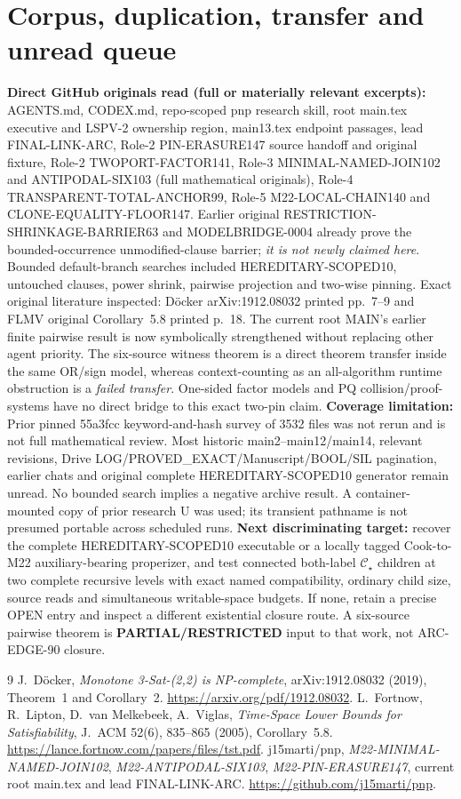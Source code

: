 \documentclass[11pt]{article}
\newcommand{\CS}{\mathcal C_{\star}}
\begin{document}
\section{Corpus, duplication, transfer and unread queue}
\textbf{Direct GitHub originals read (full or materially relevant excerpts):} AGENTS.md, CODEX.md, repo-scoped pnp research skill, root main.tex executive and LSPV-2 ownership region, main13.tex endpoint passages, lead FINAL-LINK-ARC, Role-2 PIN-ERASURE147 source handoff and original fixture, Role-2 TWOPORT-FACTOR141, Role-3 MINIMAL-NAMED-JOIN102 and ANTIPODAL-SIX103 (full mathematical originals), Role-4 TRANSPARENT-TOTAL-ANCHOR99, Role-5 M22-LOCAL-CHAIN140 and CLONE-EQUALITY-FLOOR147. Earlier original RESTRICTION-SHRINKAGE-BARRIER63 and MODELBRIDGE-0004 already prove the bounded-occurrence unmodified-clause barrier; \emph{it is not newly claimed here}. Bounded default-branch searches included HEREDITARY-SCOPED10, untouched clauses, power shrink, pairwise projection and two-wise pinning. Exact original literature inspected: D\"ocker arXiv:1912.08032 printed pp.~7--9 and FLMV original Corollary~5.8 printed p.~18. The current root MAIN's earlier finite pairwise result is now symbolically strengthened without replacing other agent priority. The six-source witness theorem is a direct theorem transfer inside the same OR/sign model, whereas context-counting as an all-algorithm runtime obstruction is a \emph{failed transfer}. One-sided factor models and PQ collision/proof-systems have no direct bridge to this exact two-pin claim.
\textbf{Coverage limitation:} Prior pinned 55a3fcc keyword-and-hash survey of 3532 files was not rerun and is not full mathematical review. Most historic main2--main12/main14, relevant revisions, Drive LOG/PROVED\_EXACT/Manuscript/BOOL/SIL pagination, earlier chats and original complete HEREDITARY-SCOPED10 generator remain unread. No bounded search implies a negative archive result. A container-mounted copy of prior research U was used; its transient pathname is not presumed portable across scheduled runs.
\textbf{Next discriminating target:} recover the complete HEREDITARY-SCOPED10 executable or a locally tagged Cook-to-M22 auxiliary-bearing properizer, and test connected both-label \(\CS\) children at two complete recursive levels with exact named compatibility, ordinary child size, source reads and simultaneous writable-space budgets. If none, retain a precise OPEN entry and inspect a different existential closure route. A six-source pairwise theorem is \textbf{PARTIAL/RESTRICTED} input to that work, not ARC-EDGE-90 closure.
\begin{thebibliography}{9}
 J.~D\"ocker, \emph{Monotone 3-Sat-(2,2) is NP-complete}, arXiv:1912.08032 (2019), Theorem~1 and Corollary~2. \url{https://arxiv.org/pdf/1912.08032}.
 L.~Fortnow, R.~Lipton, D.~van Melkebeek, A.~Viglas, \emph{Time-Space Lower Bounds for Satisfiability}, J.~ACM 52(6), 835--865 (2005), Corollary~5.8. \url{https://lance.fortnow.com/papers/files/tst.pdf}.
 j15marti/pnp, \emph{M22-MINIMAL-NAMED-JOIN102}, \emph{M22-ANTIPODAL-SIX103}, \emph{M22-PIN-ERASURE147}, current root main.tex and lead FINAL-LINK-ARC. \url{https://github.com/j15marti/pnp}.
\end{thebibliography}
\end{document}
